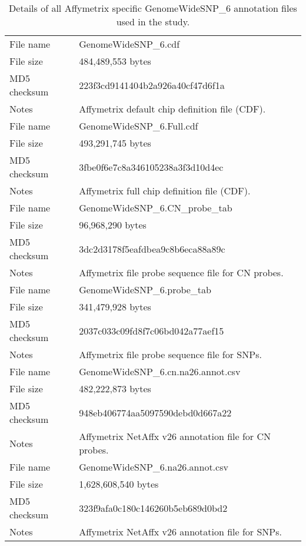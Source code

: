 \documentclass[10pt,a4paper]{article}
\begin{document}
\begin{table}[hp]
\begin{center}
\begin{tabular}{lp{}}
\hline
File name    & GenomeWideSNP\_6.cdf \\
File size    & 484,489,553 bytes \\
MD5 checksum & 223f3cd9141404b2a926a40cf47d6f1a \\
Notes        & Affymetrix default chip definition file (CDF). \\
\hline
File name    & GenomeWideSNP\_6.Full.cdf \\
File size    & 493,291,745 bytes \\
MD5 checksum & 3fbe0f6e7c8a346105238a3f3d10d4ec \\
Notes        & Affymetrix full chip definition file (CDF). \\
\hline
File name    & GenomeWideSNP\_6.CN\_probe\_tab \\
File size    & 96,968,290 bytes \\
MD5 checksum & 3dc2d3178f5eafdbea9c8b6eca88a89c \\
Notes        & Affymetrix file probe sequence file for CN probes. \\
\hline
File name    & GenomeWideSNP\_6.probe\_tab \\
File size    & 341,479,928 bytes \\
MD5 checksum & 2037c033c09fd8f7c06bd042a77aef15 \\
Notes        & Affymetrix file probe sequence file for SNPs. \\
\hline
File name    & GenomeWideSNP\_6.cn.na26.annot.csv \\
File size    & 482,222,873 bytes \\
MD5 checksum & 948eb406774aa5097590debd0d667a22 \\
Notes        & Affymetrix NetAffx v26 annotation file for CN probes. \\
\hline
File name    & GenomeWideSNP\_6.na26.annot.csv \\
File size    & 1,628,608,540 bytes \\
MD5 checksum & 323f9afa0c180c146260b5eb689d0bd2 \\
Notes        & Affymetrix NetAffx v26 annotation file for SNPs. \\
\hline
\end{tabular}
\end{center}
\caption{Details of all Affymetrix specific GenomeWideSNP\_6 annotation files used in the study.}
\label{tblGWSSixAffymetrix}
\end{table}
\end{document}
